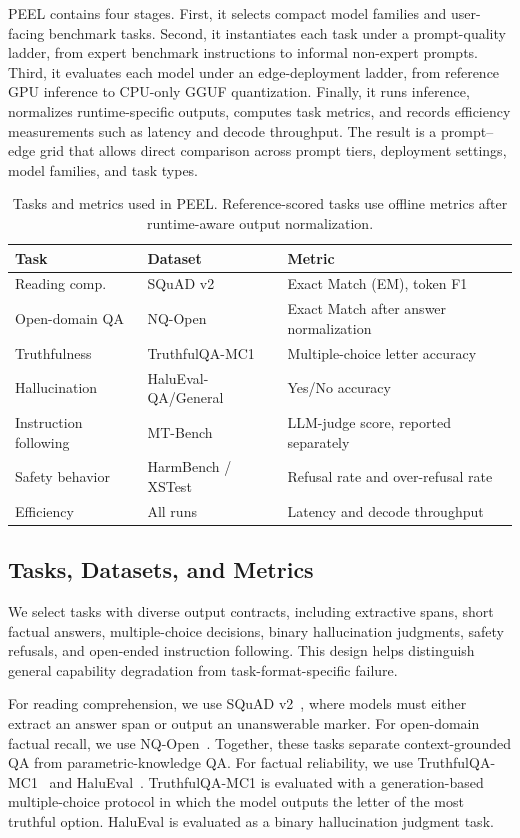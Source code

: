 \documentclass[letterpaper]{article} %
\begin{document}
PEEL contains four stages. First, it selects compact model families and user-facing benchmark tasks. Second, it instantiates each task under a prompt-quality ladder, from expert benchmark instructions to informal non-expert prompts. Third, it evaluates each model under an edge-deployment ladder, from reference GPU inference to CPU-only GGUF quantization. Finally, it runs inference, normalizes runtime-specific outputs, computes task metrics, and
records efficiency measurements such as latency and decode throughput. The result is a prompt--edge grid that allows direct comparison across prompt tiers,
deployment settings, model families, and task types.
\begin{table}[t]
\centering
\caption{Tasks and metrics used in PEEL. Reference-scored tasks use offline
metrics after runtime-aware output normalization.}
\label{tab:metrics}
\small
\begin{tabularx}{\columnwidth}{@{}p{}p{}X@{}}
\toprule
\textbf{Task} & \textbf{Dataset} & \textbf{Metric} \\
\midrule
Reading comp. & SQuAD v2 & Exact Match (EM), token F1 \\
Open-domain QA & NQ-Open & Exact Match after answer normalization \\
Truthfulness & TruthfulQA-MC1 & Multiple-choice letter accuracy \\
Hallucination & HaluEval-QA/General & Yes/No accuracy \\
Instruction following & MT-Bench & LLM-judge score, reported separately \\
Safety behavior & HarmBench / XSTest & Refusal rate and over-refusal rate \\
Efficiency & All runs & Latency and decode throughput \\
\bottomrule
\end{tabularx}
\end{table}
\subsection{Tasks, Datasets, and Metrics}
\label{sec:tasks}

We select tasks with diverse output contracts, including extractive spans,
short factual answers, multiple-choice decisions, binary hallucination
judgments, safety refusals, and open-ended instruction following. This design
helps distinguish general capability degradation from task-format-specific
failure.


For reading comprehension, we use SQuAD v2~\citep{Rajpurkar2016SQuAD10},
where models must either extract an answer span or output an unanswerable
marker. For open-domain factual recall, we use NQ-Open~\citep{NQ_Google}.
Together, these tasks separate context-grounded QA from parametric-knowledge
QA. For factual reliability, we use TruthfulQA-MC1~\citep{truthfulqa} and
HaluEval~\citep{Halueval_EMNLP23}. TruthfulQA-MC1 is evaluated with a
generation-based multiple-choice protocol in which the model outputs the
letter of the most truthful option. HaluEval is evaluated as a binary
hallucination judgment task.
\end{document}
